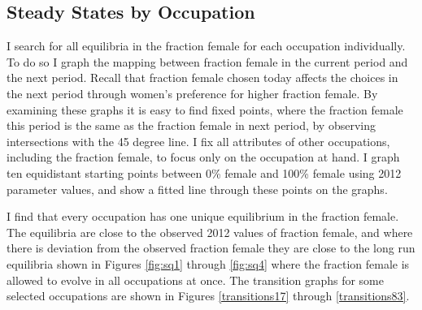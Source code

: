 \documentclass[12pt]{article}
\begin{document}

%

\subsection{Steady States by Occupation}
I search for all equilibria in the fraction female for each occupation individually. To do so I graph the mapping between fraction female in the current period and the next period. Recall that fraction female chosen today affects the choices in the next period through women's preference for higher fraction female. By examining these graphs it is easy to find fixed points, where the fraction female this period is the same as the fraction female in next period, by observing intersections with the 45 degree line. I fix all attributes of other occupations, including the fraction female, to focus only on the occupation at hand. I graph ten equidistant starting points between 0\% female and 100\% female using 2012 parameter values, and show a fitted line through these points on the graphs.

I find that every occupation has one unique equilibrium in the fraction female. The equilibria are close to the observed 2012 values of fraction female, and where there is deviation from the observed fraction female they are close to the long run equilibria shown in Figures \ref{fig:sq1} through \ref{fig:sq4} where the fraction female is allowed to evolve in all occupations at once. The transition graphs for some selected occupations are shown in Figures \ref{transitions17} through \ref{transitions83}.


\end{document}
